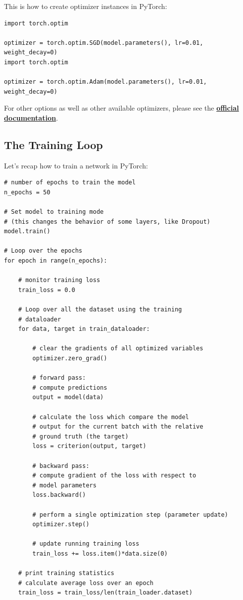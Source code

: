 This is how to create optimizer instances in PyTorch:
\begin{lstlisting}
import torch.optim

optimizer = torch.optim.SGD(model.parameters(), lr=0.01, weight_decay=0)
import torch.optim

optimizer = torch.optim.Adam(model.parameters(), lr=0.01, weight_decay=0)
\end{lstlisting}
For other options as well as other available optimizers, please see the \href{https://pytorch.org/docs/stable/optim.html}{\textbf{official documentation}}.

\subsection{The Training Loop}

Let's recap how to train a network in PyTorch:
\begin{lstlisting}
# number of epochs to train the model
n_epochs = 50

# Set model to training mode
# (this changes the behavior of some layers, like Dropout)
model.train()

# Loop over the epochs
for epoch in range(n_epochs):

    # monitor training loss
    train_loss = 0.0

    # Loop over all the dataset using the training
    # dataloader
    for data, target in train_dataloader:

        # clear the gradients of all optimized variables
        optimizer.zero_grad()

        # forward pass: 
        # compute predictions
        output = model(data)

        # calculate the loss which compare the model
        # output for the current batch with the relative
        # ground truth (the target)
        loss = criterion(output, target)

        # backward pass: 
        # compute gradient of the loss with respect to 
        # model parameters
        loss.backward()

        # perform a single optimization step (parameter update)
        optimizer.step()

        # update running training loss
        train_loss += loss.item()*data.size(0)

    # print training statistics 
    # calculate average loss over an epoch
    train_loss = train_loss/len(train_loader.dataset)
\end{lstlisting}

